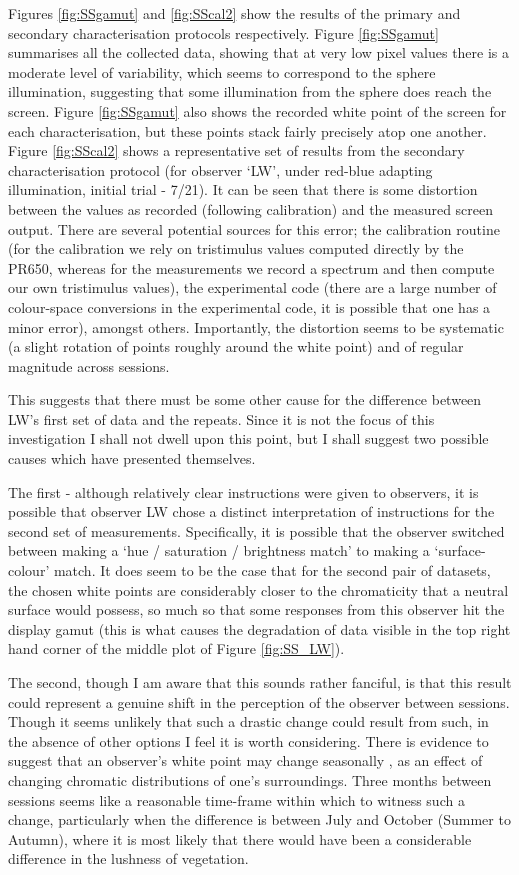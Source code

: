 Figures \ref{fig:SSgamut} and \ref{fig:SScal2} show the results of the primary and secondary characterisation protocols respectively. Figure \ref{fig:SSgamut} summarises all the collected data, showing that at very low pixel values there is a moderate level of variability, which seems to correspond to the sphere illumination, suggesting that some illumination from the sphere does reach the screen. Figure \ref{fig:SSgamut} also shows the recorded white point of the screen for each characterisation, but these points stack fairly precisely atop one another. Figure \ref{fig:SScal2} shows a representative set of results from the secondary characterisation protocol (for observer `LW', under red-blue adapting illumination, initial trial - 7/21). It can be seen that there is some distortion between the values as recorded (following calibration) and the measured screen output. There are several potential sources for this error; the calibration routine (for the calibration we rely on tristimulus values computed directly by the \gls{PR650}, whereas for the measurements we record a spectrum and then compute our own tristimulus values), the experimental code (there are a large number of colour-space conversions in the experimental code, it is possible that one has a minor error), amongst others. Importantly, the distortion seems to be systematic (a slight rotation of points roughly around the white point) and of regular magnitude across sessions.

This suggests that there must be some other cause for the difference between LW's first set of data and the repeats. Since it is not the focus of this investigation I shall not dwell upon this point, but I shall suggest two possible causes which have presented themselves. 

The first - although relatively clear instructions were given to observers, it is possible that observer LW chose a distinct interpretation of instructions for the second set of measurements. Specifically, it is possible that the observer switched between making a `hue / saturation / brightness match' to making a `surface-colour' match. It does seem to be the case that for the second pair of datasets, the chosen white points are considerably closer to the chromaticity that a neutral surface would possess, so much so that some responses from this observer hit the display gamut (this is what causes the degradation of data visible in the top right hand corner of the middle plot of Figure \ref{fig:SS_LW}).

The second, though I am aware that this sounds rather fanciful, is that this result could represent a genuine shift in the perception of the observer between sessions. Though it seems unlikely that such a drastic change could result from such, in the absence of other options I feel it is worth considering. There is evidence to suggest that an observer's white point may change seasonally \cite{welbourne_human_2015}, as an effect of changing chromatic distributions of one's surroundings. Three months between sessions seems like a reasonable time-frame within which to witness such a change, particularly when the difference is between July and October (Summer to Autumn), where it is most likely that there would have been a considerable difference in the lushness of vegetation.

